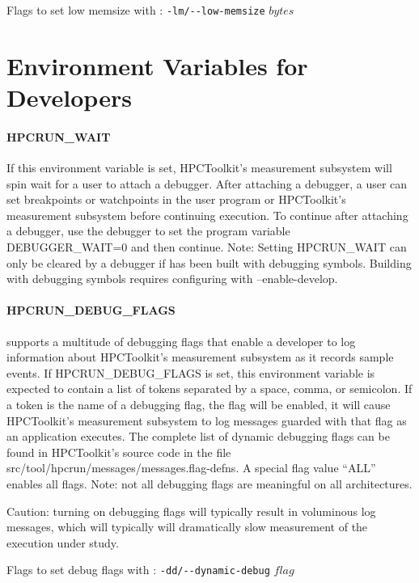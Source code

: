 \parg
Flags to set low memsize with \hpcrun: \verb|-lm/--low-memsize| $bytes$


\section{Environment Variables for Developers}
\label{system-env}

\paragraph{HPCRUN\_WAIT}

If this environment variable is set, HPCToolkit's measurement subsystem
will spin wait for a user to attach a debugger. After attaching a
debugger, a user can set breakpoints or watchpoints in the user
program or HPCToolkit's measurement subsystem before continuing
execution. To continue after attaching a debugger, use the debugger
to set the program variable DEBUGGER\_WAIT=0 and then continue.
Note: Setting HPCRUN\_WAIT can only be cleared by a debugger
if \HPCToolkit{} has been built with debugging symbols.
Building \HPCToolkit{} with debugging symbols requires
configuring \HPCToolkit{} with --enable-develop.

\paragraph{HPCRUN\_DEBUG\_FLAGS}

\HPCToolkit{} supports a multitude of debugging flags that enable a
developer to log information about HPCToolkit's measurement subsystem
as it records sample events. If HPCRUN\_DEBUG\_FLAGS is set, this
environment variable is expected to contain a list of tokens separated
by a space, comma, or semicolon. If a token is the name of a debugging
flag, the flag will be enabled, it will cause HPCToolkit's measurement
subsystem to log messages guarded with that flag as an application
executes. The complete list of dynamic debugging flags can be found
in HPCToolkit's source code in the file
src/tool/hpcrun/messages/messages.flag-defns. A special flag value ``ALL'' enables all flags. 
\parg
Note: not all debugging flags are
meaningful on all architectures. 

\parg 
Caution: turning on debugging flags
will typically result in voluminous log messages, which will typically will 
dramatically slow measurement of the execution under study.

\parg
Flags to set debug flags with \hpcrun: \verb|-dd/--dynamic-debug| $flag$


